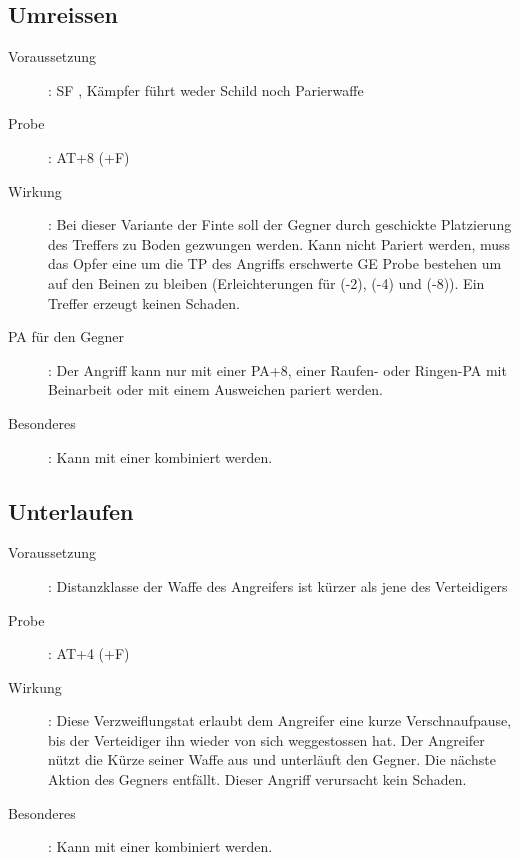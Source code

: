 \subsection{Umreissen }
\label{chap.bAT.umreissen}
\begin{description}
    \item[Voraussetzung]: SF , Kämpfer führt weder
        Schild noch Parierwaffe
    \item[Probe]: AT+8 (+F)
    \item[Wirkung]: Bei dieser Variante der Finte soll der Gegner durch
        geschickte Platzierung des Treffers zu Boden gezwungen werden. Kann
        nicht Pariert werden, muss das Opfer eine um die TP des Angriffs
        erschwerte GE Probe bestehen um auf den Beinen zu bleiben
        (Erleichterungen für  (-2),
         (-4) und 
        (-8)). Ein Treffer erzeugt keinen Schaden.
    \item[PA für den Gegner]: Der Angriff kann nur mit einer PA+8, einer
        Raufen- oder Ringen-PA mit Beinarbeit oder mit einem Ausweichen pariert
        werden.
    \item[Besonderes]: Kann mit einer  kombiniert werden.
\end{description}

\subsection{Unterlaufen }
\label{chap.bAT.unterlaufen}
\begin{description}
    \item[Voraussetzung]: Distanzklasse der Waffe des Angreifers ist kürzer als
        jene des Verteidigers
    \item[Probe]: AT+4 (+F)
    \item[Wirkung]: Diese Verzweiflungstat erlaubt dem Angreifer eine kurze
        Verschnaufpause, bis der Verteidiger ihn wieder von sich weggestossen
        hat. Der Angreifer nützt die Kürze seiner Waffe aus und unterläuft den
        Gegner. Die nächste Aktion des Gegners entfällt.  Dieser Angriff
        verursacht kein Schaden.
    \item[Besonderes]: Kann mit einer  kombiniert werden.
\end{description}

